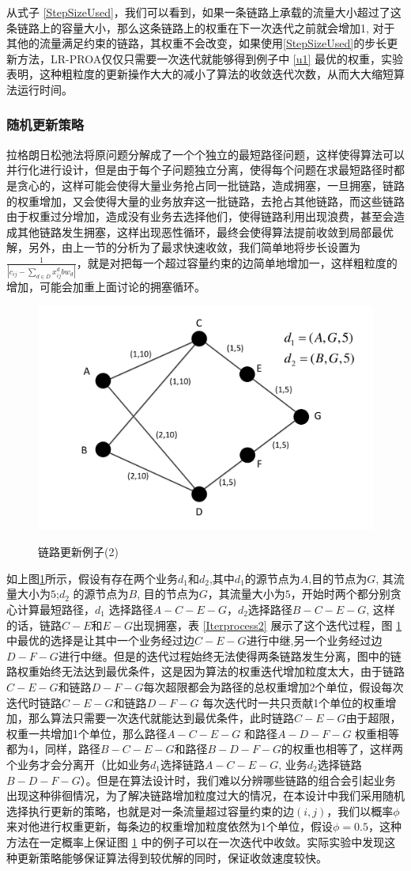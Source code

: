 从式子 \ref{StepSizeUsed}，我们可以看到，如果一条链路上承载的流量大小超过了这条链路上的容量大小，那么这条链路上的权重在下一次迭代之前就会增加1, 对于其他的流量满足约束的链路，其权重不会改变，如果使用\ref{StepSizeUsed}的步长更新方法，LR-PROA仅仅只需要一次迭代就能够得到例子中 \ref{u1} 最优的权重，实验表明，这种粗粒度的更新操作大大的减小了算法的收敛迭代次数，从而大大缩短算法运行时间。
\subsubsection{随机更新策略}

拉格朗日松弛法将原问题分解成了一个个独立的最短路径问题，这样使得算法可以并行化进行设计，但是由于每个子问题独立分离，使得每个问题在求最短路径时都是贪心的，这样可能会使得大量业务抢占同一批链路，造成拥塞，一旦拥塞，链路的权重增加，又会使得大量的业务放弃这一批链路，去抢占其他链路，而这些链路由于权重过分增加，造成没有业务去选择他们，使得链路利用出现浪费，甚至会造成其他链路发生拥塞，这样出现恶性循环，最终会使得算法提前收敛到局部最优解，另外，由上一节的分析为了最求快速收敛，我们简单地将步长设置为$\frac{1}{|c_{ij}-\sum\limits_{d \in D} x_{ij}^d bw_d|}$，就是对把每一个超过容量约束的边简单地增加一，这样粗粒度的增加，可能会加重上面讨论的拥塞循环。
\begin{figure}
\setlength{\belowcaptionskip}{-0.1cm}
\begin{center}
{\includegraphics[width=0.4 \textwidth]{figures/random.pdf}}
\end{center}
\caption{{\footnotesize{链路更新例子(2)}}}
\label{u2}
\end{figure}
如上图\ref{u2}所示，假设有存在两个业务$d_1$和$d_2$,其中$d_1$的源节点为$A$,目的节点为$G$, 其流量大小为$5$;$d_2$ 的源节点为$B$, 目的节点为$G$，其流量大小为$5$，开始时两个都分别贪心计算最短路径，$d_1$ 选择路径$A-C-E-G$，$d_2$选择路径$B-C-E-G$, 这样的话，链路$C-E$和$E-G$出现拥塞，表 \ref{Iterprocess2} 展示了这个迭代过程，图 \ref{u2}中最优的选择是让其中一个业务经过边$C-E-G$进行中继,另一个业务经过边$D-F-G$进行中继。但是的迭代过程始终无法使得两条链路发生分离，图中的链路权重始终无法达到最优条件，这是因为算法的权重迭代增加粒度太大，由于链路$C-E-G$和链路$D-F-G$每次超限都会为路径的总权重增加2个单位，假设每次迭代时链路$C-E-G$和链路$D-F-G$ 每次迭代时一共只贡献1个单位的权重增加，那么算法只需要一次迭代就能达到最优条件，此时链路$C-E-G$由于超限，权重一共增加1个单位，那么路径$A-C-E-G$ 和路径$A-D-F-G$ 权重相等都为4，同样，路径$B-C-E-G$和路径$B-D-F-G$的权重也相等了，这样两个业务才会分离开（比如业务$d_1$选择链路$A-C-E-G$, 业务$d_2$选择链路$B-D-F-G$）。但是在算法设计时，我们难以分辨哪些链路的组合会引起业务出现这种徘徊情况，为了解决链路增加粒度过大的情况，在本设计中我们采用随机选择执行更新的策略，也就是对一条流量超过容量约束的边$(i,j)$，我们以概率$\phi$ 来对他进行权重更新，每条边的权重增加粒度依然为1个单位，假设$\phi=0.5$，这种方法在一定概率上保证图 \ref{u2} 中的例子可以在一次迭代中收敛。实际实验中发现这种更新策略能够保证算法得到较优解的同时，保证收敛速度较快。
